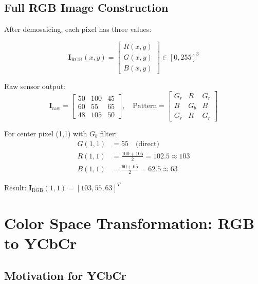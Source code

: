 \documentclass[11pt,a4paper]{article}
\newcommand{\mat}[1]{\mathbf{#1}}
\begin{document}
\subsection{Full RGB Image Construction}

After demosaicing, each pixel has three values:

\begin{equation}
\mat{I}_{\text{RGB}}(x, y) = \begin{bmatrix} R(x, y) \\ G(x, y) \\ B(x, y) \end{bmatrix} \in [0, 255]^3
\end{equation}

\begin{tcolorbox}[colback=green!5!white,colframe=green!75!black,title=Example: Demosaicing a 3×3 Bayer Pattern]
Raw sensor output:
\[
\mat{I}_{\text{raw}} = \begin{bmatrix}
50 & 100 & 45 \\
60 & 55 & 65 \\
48 & 105 & 50
\end{bmatrix}, \quad
\text{Pattern} = \begin{bmatrix}
G_r & R & G_r \\
B & G_b & B \\
G_r & R & G_r
\end{bmatrix}
\]

For center pixel (1,1) with $G_b$ filter:
\begin{align*}
G(1,1) &= 55 \quad \text{(direct)} \\
R(1,1) &= \frac{100 + 105}{2} = 102.5 \approx 103 \\
B(1,1) &= \frac{60 + 65}{2} = 62.5 \approx 63
\end{align*}

Result: $\mat{I}_{\text{RGB}}(1,1) = [103, 55, 63]^T$
\end{tcolorbox}

\section{Color Space Transformation: RGB to YCbCr}

\subsection{Motivation for YCbCr}
\end{document}
